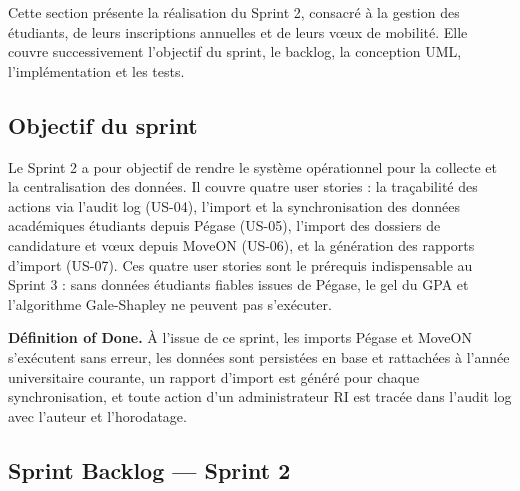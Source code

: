 Cette section présente la réalisation du Sprint 2, consacré à la gestion des étudiants, de leurs inscriptions annuelles et de leurs vœux de mobilité. Elle couvre successivement l'objectif du sprint, le backlog, la conception UML, l'implémentation et les tests.

\subsection{Objectif du sprint}

Le Sprint 2 a pour objectif de rendre le système opérationnel pour la collecte et la centralisation des données. Il couvre quatre user stories : la traçabilité des actions via l'audit log (US-04), l'import et la synchronisation des données académiques étudiants depuis Pégase (US-05), l'import des dossiers de candidature et vœux depuis MoveON (US-06), et la génération des rapports d'import (US-07). Ces quatre user stories sont le prérequis indispensable au Sprint 3 : sans données étudiants fiables issues de Pégase, le gel du GPA et l'algorithme Gale-Shapley ne peuvent pas s'exécuter.

\textbf{Définition of Done.} À l'issue de ce sprint, les imports Pégase et MoveON s'exécutent sans erreur, les données sont persistées en base et rattachées à l'année universitaire courante, un rapport d'import est généré pour chaque synchronisation, et toute action d'un administrateur RI est tracée dans l'audit log avec l'auteur et l'horodatage.

\setcounter{tasknum}{1}

\subsection{Sprint Backlog — Sprint 2}

\begingroup
\footnotesize
\setlength{\tabcolsep}{3pt}
\renewcommand{\arraystretch}{1.6}

